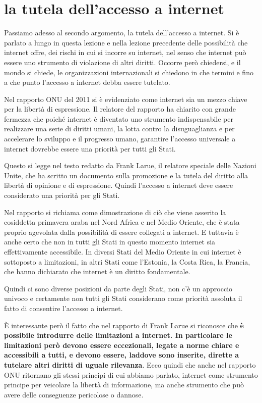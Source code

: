\section{la tutela dell'accesso a internet}
Passiamo adesso al secondo argomento, la tutela dell'accesso a internet. Si è parlato a lungo in questa lezione e nella lezione precedente delle possibilità che internet offre, dei rischi in cui si incorre su internet, nel senso che internet può essere uno strumento di violazione di altri diritti. Occorre però chiedersi, e il mondo si chiede, le organizzazioni internazionali si chiedono in che termini e fino a che punto l'accesso a internet debba essere tutelato. \par
Nel rapporto ONU del 2011 si è evidenziato come internet sia un mezzo chiave per la libertà di espressione. Il relatore del rapporto ha chiarito con grande fermezza che poiché internet è diventato uno strumento indispensabile per realizzare una serie di diritti umani, la lotta contro la disuguaglianza e per accelerare lo sviluppo e il progresso umano, garantire l'accesso universale a internet dovrebbe essere una priorità per tutti gli Stati. \par
Questo si legge nel testo redatto da Frank Larue, il relatore speciale delle Nazioni Unite, che ha scritto un documento sulla promozione e la tutela del diritto alla libertà di opinione e di espressione. Quindi l'accesso a internet deve essere considerato una priorità per gli Stati. \par
Nel rapporto si richiama come dimostrazione di ciò che viene asserito la cosiddetta primavera araba nel Nord Africa e nel Medio Oriente, che è stata proprio agevolata dalla possibilità di essere collegati a internet. E tuttavia è anche certo che non in tutti gli Stati in questo momento internet sia effettivamente accessibile. In diversi Stati del Medio Oriente in cui internet è sottoposto a limitazioni, in altri Stati come l'Estonia, la Costa Rica, la Francia, che hanno dichiarato che internet è un diritto fondamentale. \par
Quindi ci sono diverse posizioni da parte degli Stati, non c'è un approccio univoco e certamente non tutti gli Stati considerano come priorità assoluta il fatto di consentire l'accesso a internet. \par
È interessante però il fatto che nel rapporto di Frank Larue si riconosce che \textbf{è possibile introdurre delle limitazioni a internet. In particolare le limitazioni però devono essere eccezionali, legate a norme chiare e accessibili a tutti, e devono essere, laddove sono inserite, dirette a tutelare altri diritti di uguale rilevanza}. Ecco quindi che anche nel rapporto ONU ritornano gli stessi principi di cui abbiamo parlato, internet come strumento principe per veicolare la libertà di informazione, ma anche strumento che può avere delle conseguenze pericolose o dannose.\par

